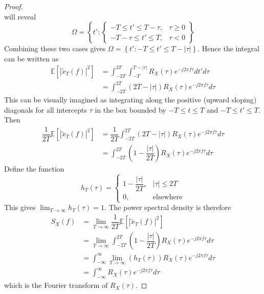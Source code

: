 \documentclass[11pt]{report} %
\begin{document}
\begin{proof}
\begin{equation}
\end{equation}
will reveal
\begin{equation}
\Omega = \left\{t': \begin{cases} -T \leq t' \leq T - \tau, & \tau \geq 0 \\ -T - \tau \leq t' \leq T, & \tau < 0\end{cases}\right\}
\end{equation}
Combining these two cases gives $\Omega = \left\{t': -T \leq t' \leq T - \left|\tau\right|\right\}$. Hence the integral can be written as
\begin{align}
\mathbb{E}\left[\left|\widetilde{x}_{T}\left(f\right)\right|^{2}\right] &= \int_{-2T}^{2T}\int_{-T}^{T-\left|\tau\right|}R_{X}\left(\tau\right)e^{-j2\pi f\tau}dt'd\tau \\
&= \int_{-2T}^{2T}\left(2T-\left|\tau\right|\right)R_{X}\left(\tau\right)e^{-j2\pi f\tau}d\tau
\end{align}
This can be visually imagined as integrating along the positive (upward sloping) diagonals for all intercepts $\tau$ in the box bounded by $-T\leq t \leq T$ and $-T \leq t'\leq T$. Then 
\begin{align}
\dfrac{1}{2T}\mathbb{E}\left[\left|\widetilde{x}_{T}\left(f\right)\right|^{2}\right] &= \dfrac{1}{2T}\int_{-2T}^{2T}\left(2T-\left|\tau\right|\right)R_{X}\left(\tau\right)e^{-j2\pi f\tau}d\tau \\
&= \int_{-2T}^{2T}\left(1-\dfrac{\left|\tau\right|}{2T}\right)R_{X}\left(\tau\right)e^{-j2\pi f\tau}d\tau
\end{align}
Define the function
\begin{equation}
h_{T}\left(\tau\right) = \begin{cases} 1 -\dfrac{\left|\tau\right|}{2T}, & \left|\tau\right| \leq 2T \\ 0, & \mathrm{elsewhere}\end{cases}
\end{equation}
This gives $\lim_{T\to\infty}h_{T}\left(\tau\right) = 1$. The power spectral density is therefore
\begin{align}
S_{X}\left(f\right) &= \lim_{T\to\infty}\dfrac{1}{2T}\mathbb{E}\left[\left|\widetilde{x}_{T}\left(f\right)\right|^{2}\right] \\
&= \lim_{T\to\infty}\int_{-2T}^{2T}\left(1-\dfrac{\left|\tau\right|}{2T}\right)R_{X}\left(\tau\right)e^{-j2\pi f\tau}d\tau \\
&= \int_{-\infty}^{\infty}\lim_{T\to\infty}\left(h_{T}\left(\tau\right)\right)R_{X}\left(\tau\right)e^{-j2\pi f\tau}d\tau \\
&= \int_{-\infty}^{\infty}R_{X}\left(\tau\right)e^{-j2\pi f\tau}d\tau
\end{align}
which is the Fourier transform of $R_{X}\left(\tau\right)$.
\end{proof}
\end{document}
